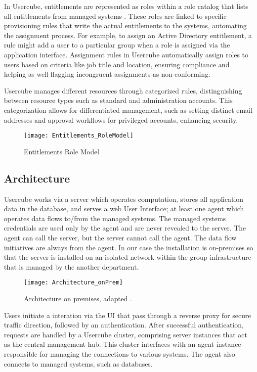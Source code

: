 In Usercube, entitlements are represented as roles within a role catalog that lists all entitlements from managed systems \cite{UsercubeDocument}. These roles are linked to specific provisioning rules that write the actual entitlements to the systems, automating the assignment process. For example, to assign an Active Directory entitlement, a rule might add a user to a particular group when a role is assigned via the application interface. Assignment rules in Usercube automatically assign roles to users based on criteria like job title and location, ensuring compliance and helping as well flagging incongruent assignments as non-conforming.

Usercube manages different resources through categorized rules, distinguishing between resource types such as standard and administration accounts. This categorization allows for differentiated management, such as setting distinct email addresses and approval workflows for privileged accounts, enhancing security.

\begin{figure}[htbp]
  \centering
  \texttt{[image: Entitlements\_RoleModel]}
  \caption{Entitlements Role Model}
  \label{fig:Entitlements_RoleModel}
\end{figure}

\subsection{Architecture}

Usercube works via a server which operates computation, stores all application data in the database, and serves a web User Interface; at least one agent which operates data flows to/from the managed systems. The managed systems credentials are used only by the agent and are never revealed to the server. The agent can call the server, but the server cannot call the agent. The data flow initiatives are always from the agent. In our case the installation is on-premises so that the server is installed on an isolated network within the group infrastructure that is managed by the another department.

\begin{figure}[htbp]
  \centering
  \texttt{[image: Architecture\_onPrem]}
  \caption{Architecture on premises, adapted \cite{UsercubeDocument}.}
  \label{fig:Architecture_onPrem}
\end{figure}

Users initiate a interation via the UI that pass through a reverse proxy for secure traffic direction, followed by an authentication. After successful authentication, requests are handled by a Usercube cluster, comprising server instances that act as the central management hub. This cluster interfaces with an agent instance responsible for managing the connections to various systems. The agent also connects to managed systems, such as databases.


